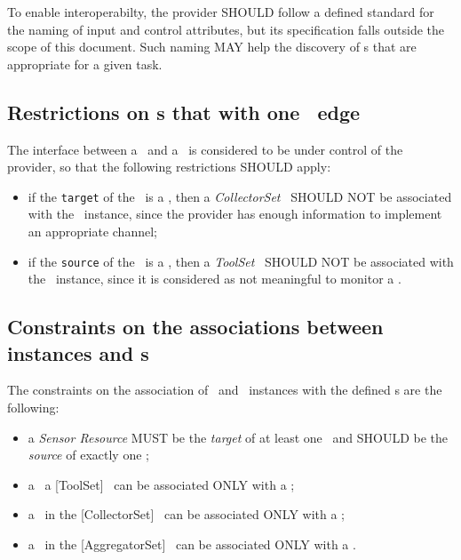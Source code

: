 \documentclass[12pt]{article}  %
\begin{document}
To enable interoperabilty, the provider SHOULD follow a defined standard for the naming of input and control attributes, but its specification falls outside the scope of this document. Such naming MAY help the discovery of \mi s that are appropriate for a given task.

\subsection{Restrictions on \coll s that with one \sens\ edge}

The interface between a \sens\ and a \coll\ is considered to be under control of the provider, so that the following restrictions SHOULD apply:

\begin{itemize}

\item if the {\tt target} of the \coll\ is a \sens, then a {\em CollectorSet} \mi\ SHOULD NOT be associated with the \coll\ instance, since the provider has enough information to implement an appropriate channel;

\item if the {\tt source} of the \coll\ is a \sens, then a {\em ToolSet} \mi\ SHOULD NOT be associated with the \coll\ instance, since it is considered as not meaningful to monitor a \sens.

\end{itemize}

\subsection{Constraints on the associations between instances and \mi s}

The constraints on the association of \sens\ and \coll\ instances with the defined \mi s are the following:

\begin{itemize}

\item a {\em Sensor Resource} MUST be the {\em target} of at least one \coll\ and SHOULD be the {\em source} of exactly one \coll;

\item a \mi\ a [{ToolSet}] \mi\ can be associated ONLY with a \coll;

\item a \mi\ in the [{CollectorSet}] \mi\ can be associated ONLY with a \coll;

\item a \mi\ in the [{AggregatorSet}] \mi\ can be associated ONLY with a \sens.

\end{itemize}
\end{document}
